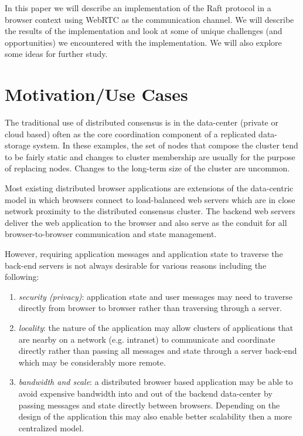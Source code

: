 \documentclass[9pt]{extarticle}
\begin{document}
\begin{multicols}{2}
In this paper we will describe an implementation of the Raft protocol
in a browser context using WebRTC as the communication channel. We
will describe the results of the implementation and look at some of
unique challenges (and opportunities) we encountered with the
implementation. We will also explore some ideas for further study.

\section{Motivation/Use Cases}
The traditional use of distributed consensus is in the data-center
(private or cloud based) often as the core coordination component
of a replicated data-storage system. %
In these examples, the set of nodes that compose the cluster tend to
be fairly static and changes to cluster membership are usually for the
purpose of replacing nodes. Changes to the long-term size of the
cluster are uncommon. %

Most existing distributed browser applications are extensions of the
data-centric model in which browsers connect to load-balanced web
servers which are in close network proximity to the distributed
consensus cluster. %
The backend web servers deliver the web application to the browser and
also serve as the conduit for all browser-to-browser communication and
state management.

However, requiring application messages and application state to
traverse the back-end servers is not always desirable for various
reasons including the following:

\begin{enumerate}
\item \emph{security (privacy)}: application state and user messages
    may need to traverse directly from browser to browser rather than
    traversing through a server.
\item \emph{locality}: the nature of the application may allow
    clusters of applications that are nearby on a network (e.g.
    intranet) to communicate and coordinate directly rather than
    passing all messages and state through a server back-end which may
    be considerably more remote.
\item \emph{bandwidth and scale}: a distributed browser based
    application may be able to avoid expensive bandwidth into and out
    of the backend data-center by passing messages and state directly
    between browsers.  Depending on the design of the application this
    may also enable better scalability then a more centralized model.
\end{enumerate}


\end{multicols}
\end{document}
